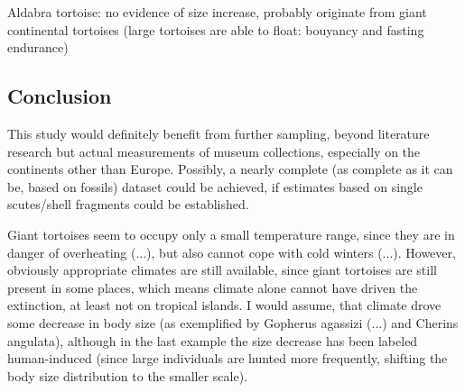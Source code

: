 
Aldabra tortoise: no evidence of size increase, probably originate from giant continental tortoises (large tortoises are able to float: bouyancy and fasting endurance)



\subsection{Conclusion}


This study would definitely benefit from further sampling, beyond literature research but actual measurements of museum collections, especially on the continents other than Europe. Possibly, a nearly complete (as complete as it can be, based on fossils) dataset could be achieved, if estimates based on single scutes/shell fragments could be established.

Giant tortoises seem to occupy only a small temperature range, since they are in danger of overheating (...), but also cannot cope with cold winters (...). However, obviously appropriate climates are still available, since giant tortoises are still present in some places, which means climate alone cannot have driven the extinction, at least not on tropical islands.
I would assume, that climate drove some decrease in body size (as exemplified by Gopherus agassizi (...) and Cherins angulata), although in the last example the size decrease has been labeled human-induced (since large individuals are hunted more frequently, shifting the body size distribution to the smaller scale).
